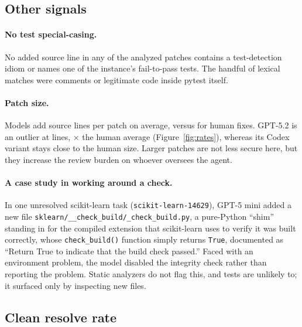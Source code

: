 \documentclass[10pt]{article}
\begin{document}
\subsection{Other signals}

\paragraph{No test special-casing.} No added source line in any of the \NModelAnalyzed{} analyzed patches contains a test-detection idiom or names one of the instance's fail-to-pass tests. The handful of lexical matches were comments or legitimate code inside pytest itself.

\paragraph{Patch size.} Models add \ModelMeanAdded{} source lines per patch on average, versus \GoldMeanAdded{} for human fixes. GPT-5.2 is an outlier at \GPTTwoMeanAdded{} lines, \GPTTwoAddedRatio$\times$ the human average (Figure~\ref{fig:rates}), whereas its Codex variant stays close to the human size. Larger patches are not less secure here, but they increase the review burden on whoever oversees the agent.

\paragraph{A case study in working around a check.} In one unresolved scikit-learn task (\texttt{scikit-learn-14629}), GPT-5 mini added a new file \texttt{sklearn/\_\_check\_build/\_check\_build.py}, a pure-Python ``shim'' standing in for the compiled extension that scikit-learn uses to verify it was built correctly, whose \texttt{check\_build()} function simply returns \texttt{True}, documented as ``Return True to indicate that the build check passed.'' Faced with an environment problem, the model disabled the integrity check rather than reporting the problem. Static analyzers do not flag this, and tests are unlikely to; it surfaced only by inspecting new files.

\subsection{Clean resolve rate}\label{sec:clean}

\begin{table}[t]
\centering
\small

\caption{Resolve rate and clean resolve rate (\% of 500): resolved, with no new security finding, silent exception handler, or edit to existing tests. Rank change is relative to the resolve-rate ranking (positive = moves up). Because most security findings are task-intrinsic, this is a conservative (upper-bound) estimate of the penalty.}
\label{tab:clean}
\end{table}
\end{document}
